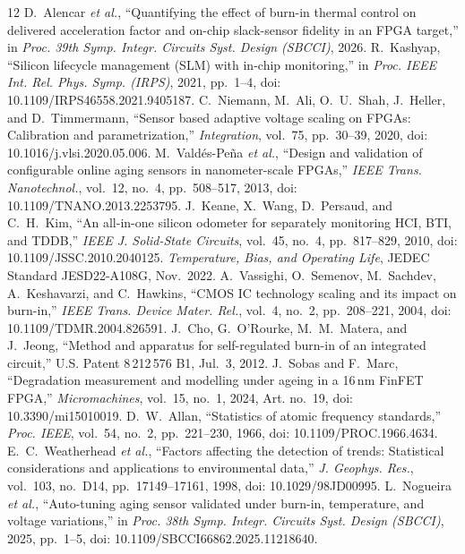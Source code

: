 \documentclass[10pt,twocolumn]{article}
\begin{document}
\renewcommand{\refname}{References}\begin{thebibliography}{12}
\footnotesize
{} D.~Alencar \emph{et al.}, ``Quantifying the effect of burn-in thermal control on delivered acceleration factor and on-chip slack-sensor fidelity in an FPGA target,'' in \emph{Proc. 39th Symp. Integr. Circuits Syst. Design (SBCCI)}, 2026.
 R.~Kashyap, ``Silicon lifecycle management (SLM) with in-chip monitoring,'' in \emph{Proc. IEEE Int. Rel. Phys. Symp. (IRPS)}, 2021, pp.~1--4, doi: 10.1109/IRPS46558.2021.9405187.
 C.~Niemann, M.~Ali, O.~U.~Shah, J.~Heller, and D.~Timmermann, ``Sensor based adaptive voltage scaling on FPGAs: Calibration and parametrization,'' \emph{Integration}, vol.~75, pp.~30--39, 2020, doi: 10.1016/j.vlsi.2020.05.006.
 M.~Vald\'es-Pe\~na \emph{et al.}, ``Design and validation of configurable online aging sensors in nanometer-scale FPGAs,'' \emph{IEEE Trans. Nanotechnol.}, vol.~12, no.~4, pp.~508--517, 2013, doi: 10.1109/TNANO.2013.2253795.
 J.~Keane, X.~Wang, D.~Persaud, and C.~H.~Kim, ``An all-in-one silicon odometer for separately monitoring HCI, BTI, and TDDB,'' \emph{IEEE J. Solid-State Circuits}, vol.~45, no.~4, pp.~817--829, 2010, doi: 10.1109/JSSC.2010.2040125.
 \emph{Temperature, Bias, and Operating Life}, JEDEC Standard JESD22-A108G, Nov.~2022.
 A.~Vassighi, O.~Semenov, M.~Sachdev, A.~Keshavarzi, and C.~Hawkins, ``CMOS IC technology scaling and its impact on burn-in,'' \emph{IEEE Trans. Device Mater. Rel.}, vol.~4, no.~2, pp.~208--221, 2004, doi: 10.1109/TDMR.2004.826591.
 J.~Cho, G.~O'Rourke, M.~M.~Matera, and J.~Jeong, ``Method and apparatus for self-regulated burn-in of an integrated circuit,'' U.S. Patent 8\,212\,576 B1, Jul.~3, 2012.
 J.~Sobas and F.~Marc, ``Degradation measurement and modelling under ageing in a 16\,nm FinFET FPGA,'' \emph{Micromachines}, vol.~15, no.~1, 2024, Art. no.~19, doi: 10.3390/mi15010019.
 D.~W.~Allan, ``Statistics of atomic frequency standards,'' \emph{Proc. IEEE}, vol.~54, no.~2, pp.~221--230, 1966, doi: 10.1109/PROC.1966.4634.
 E.~C.~Weatherhead \emph{et al.}, ``Factors affecting the detection of trends: Statistical considerations and applications to environmental data,'' \emph{J. Geophys. Res.}, vol.~103, no.~D14, pp.~17149--17161, 1998, doi: 10.1029/98JD00995.
 L.~Nogueira \emph{et al.}, ``Auto-tuning aging sensor validated under burn-in, temperature, and voltage variations,'' in \emph{Proc. 38th Symp. Integr. Circuits Syst. Design (SBCCI)}, 2025, pp.~1--5, doi: 10.1109/SBCCI66862.2025.11218640.
\end{thebibliography}
\end{document}
